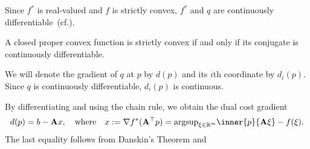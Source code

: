 Since $f^*$ is real-valued and $f$ is strictly convex, 
$f^*$ and $q$ are continuously differentiable~(cf.\cite[Theorem~26.3]{Rockafellar1970}).
\begin{theorem*}
  \emph{}
  A closed proper convex function is strictly convex
  if and only if its conjugate is continuously differentiable.
\end{theorem*}

We will denote the gradient of $q$ at $p$ by $d(p)$
and its $i$th coordinate by $d_i(p).$
Since $q$ is continuously differentiable, $d_i(p)$ is continuous.

By differentiating and using the chain rule, 
we obtain the dual cost gradient
\begin{gather}
  \label{cv:ts:1}
  d(p)=b-\mathbf{A}x,
  \quad
  \text{where}
  \quad
  x:=
  \nabla
  f^*
  (
    \mathbf{A}^\top
    p
  )
  =
  \mathrm{argsup}
  _{\xi \in \R^m}
  \inner{p}{\mathbf{A}\xi}
  - f(\xi)
  .
\end{gather}
The last equality follows from Danskin's Theorem and \cite[Theorem~23.5]{Rockafellar1970}


